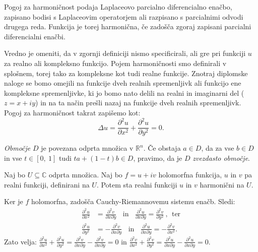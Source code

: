 \documentclass[mat1]{fmfdelo}
\begin{document}
    Pogoj za harmoničnost podaja Laplaceovo parcialno diferencialno enačbo, zapisano bodisi s Laplaceovim operatorjem ali razpisano s parcialnimi odvodi drugega reda. 
    Funkcija je torej harmonična, če zadošča zgoraj zapisani parcialni diferencialni enačbi. 

    \begin{opomba}
        Vredno je omeniti, da v zgornji definiciji nismo specificirali, ali gre pri funkciji $u$ za realno ali kompleksno funkcijo. 
        Pojem harmoničnosti smo definirali v splošnem, torej tako za kompleksne kot tudi realne funkcije.
        Znotraj diplomske naloge se bomo omejili na funkcije dveh realnih spremenljivk ali funkcijo ene kompleksne spremenljivke, ki jo bomo nato delili na realni in imaginarni del ($z = x + iy $) in na ta način prešli nazaj na funkcije dveh realnih spremenljivk.
        \newline
        Pogoj za harmoničnost takrat zapišemo kot: 
            $$
                \Delta u = \frac{\partial^2 u}{\partial x ^ 2} +  \frac{\partial^2 u}{\partial y ^ 2}= 0.
            $$
    \end{opomba}

    \begin{definicija}
        \emph{Območje} $D$ je povezana odprta množica v $\mathbb{R}^n$.
        Če obstaja $a \in D$, da za vse $b \in D$ in vse $t \in [0,~1]$ tudi $t a + (1-t)b \in D$, pravimo, da je $D$ \emph{zvezdasto območje}.
    \end{definicija}


    \begin{trditev}
        \label{hh}
        Naj bo $U \subseteq \mathbb{C}$ odprta množica. Naj bo $f = u + iv$ holomorfna funkcija, $u$ in $v$ pa realni funkciji, definirani na $U$. Potem sta realni funkciji $u$ in $v$ harmonični na $U$.
    \end{trditev}

    \begin{dokaz}
        Ker je $f$ holomorfna, zadošča Cauchy-Riemannovemu sistemu enačb. Sledi: 
        \begin{align*}
            \frac{\partial^2 u}{\partial x^2} &= \frac{\partial^2 v}{\partial x \partial y}~~~~\text{in}~~~~\frac{\partial^2 u}{\partial x \partial y} = \frac{\partial^2 v}{\partial y^2}~,~~\text{ter}\\ 
            \frac{\partial^2 u}{\partial y^2} &=  - \frac{\partial^2 v}{\partial x \partial y}~~~~\text{in}~~~~\frac{\partial^2 u}{\partial x \partial y} =  - \frac{\partial^2 v}{\partial x^2}.
        \end{align*}
        Zato velja: $\frac{\partial^2 u}{\partial x^2} + \frac{\partial^2 u}{\partial y^2} = \frac{\partial^2 v}{\partial x \partial y} - \frac{\partial^2 v}{\partial x \partial y} =0$ in $\frac{\partial^2 v}{\partial x^2} + \frac{\partial^2 v}{\partial y^2} = \frac{\partial^2 u}{\partial x \partial y} - \frac{\partial^2 u}{\partial x \partial y}=0$.
    \end{dokaz}
\end{document}
